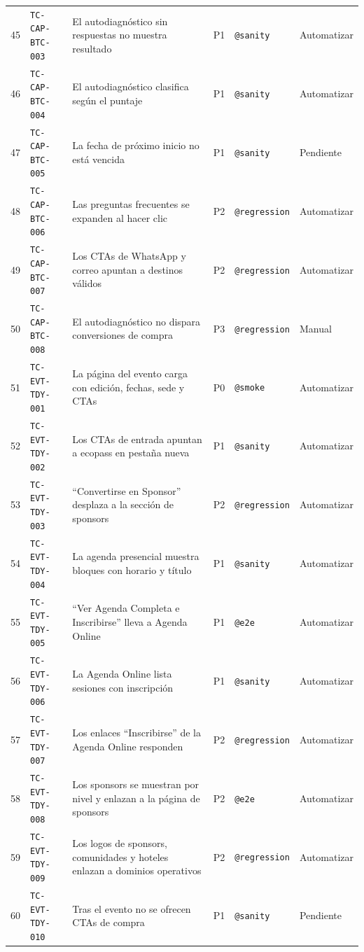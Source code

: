 \documentclass[11pt,a4paper]{article}
\newcommand{\tcid}[1]{\texttt{#1}}
\begin{document}
{\begin{xltabular}{\textwidth}{@{}r l X c l l@{}}
45 & \tcid{TC-CAP-BTC-003} & El autodiagnóstico sin respuestas no muestra resultado & P1 & \texttt{@sanity} & Automatizar \\
46 & \tcid{TC-CAP-BTC-004} & El autodiagnóstico clasifica según el puntaje & P1 & \texttt{@sanity} & Automatizar \\
47 & \tcid{TC-CAP-BTC-005} & La fecha de próximo inicio no está vencida & P1 & \texttt{@sanity} & Pendiente \\
48 & \tcid{TC-CAP-BTC-006} & Las preguntas frecuentes se expanden al hacer clic & P2 & \texttt{@regression} & Automatizar \\
49 & \tcid{TC-CAP-BTC-007} & Los CTAs de WhatsApp y correo apuntan a destinos válidos & P2 & \texttt{@regression} & Automatizar \\
50 & \tcid{TC-CAP-BTC-008} & El autodiagnóstico no dispara conversiones de compra & P3 & \texttt{@regression} & Manual \\
51 & \tcid{TC-EVT-TDY-001} & La página del evento carga con edición, fechas, sede y CTAs & P0 & \texttt{@smoke} & Automatizar \\
52 & \tcid{TC-EVT-TDY-002} & Los CTAs de entrada apuntan a ecopass en pestaña nueva & P1 & \texttt{@sanity} & Automatizar \\
53 & \tcid{TC-EVT-TDY-003} & ``Convertirse en Sponsor'' desplaza a la sección de sponsors & P2 & \texttt{@regression} & Automatizar \\
54 & \tcid{TC-EVT-TDY-004} & La agenda presencial muestra bloques con horario y título & P1 & \texttt{@sanity} & Automatizar \\
55 & \tcid{TC-EVT-TDY-005} & ``Ver Agenda Completa e Inscribirse'' lleva a Agenda Online & P1 & \texttt{@e2e} & Automatizar \\
56 & \tcid{TC-EVT-TDY-006} & La Agenda Online lista sesiones con inscripción & P1 & \texttt{@sanity} & Automatizar \\
57 & \tcid{TC-EVT-TDY-007} & Los enlaces ``Inscribirse'' de la Agenda Online responden & P2 & \texttt{@regression} & Automatizar \\
58 & \tcid{TC-EVT-TDY-008} & Los sponsors se muestran por nivel y enlazan a la página de sponsors & P2 & \texttt{@e2e} & Automatizar \\
59 & \tcid{TC-EVT-TDY-009} & Los logos de sponsors, comunidades y hoteles enlazan a dominios operativos & P2 & \texttt{@regression} & Automatizar \\
60 & \tcid{TC-EVT-TDY-010} & Tras el evento no se ofrecen CTAs de compra & P1 & \texttt{@sanity} & Pendiente \\

\end{xltabular}}
\end{document}
